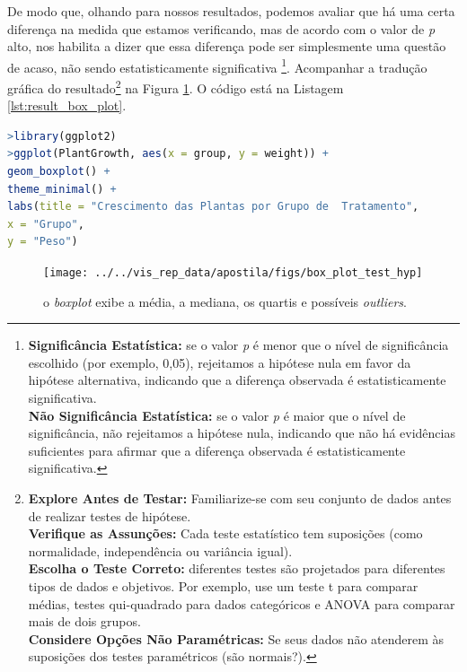 \documentclass[article]{memoir}
\begin{document}
De modo que, olhando para nossos resultados, podemos avaliar que há uma certa diferença na medida que estamos verificando, mas de acordo com o valor de \textit{p} alto, nos habilita a dizer que essa diferença pode ser simplesmente uma questão de acaso, não sendo estatisticamente significativa \footnote{\textbf{Significância Estatística:} se o valor \textit{p} é menor que o nível de significância escolhido (por exemplo, 0,05), rejeitamos a hipótese nula em favor da hipótese alternativa, indicando que a diferença observada é estatisticamente significativa.\\
	
	\textbf{Não Significância Estatística:} se o valor \textit{p} é maior que o nível de significância, não rejeitamos a hipótese nula, indicando que não há evidências suficientes para afirmar que a diferença observada é estatisticamente significativa.}. Acompanhar a tradução gráfica do resultado\footnote{\textbf{Explore Antes de Testar:} Familiarize-se com seu conjunto de dados antes de realizar testes de hipótese. \\
	\textbf{Verifique as Assunções:} Cada teste estatístico tem suposições (como normalidade, independência ou variância igual). \\ 
	\textbf{Escolha o Teste Correto:} diferentes testes são projetados para diferentes tipos de dados e objetivos. Por exemplo, use um teste t para comparar médias, testes qui-quadrado para dados categóricos e ANOVA para comparar mais de dois grupos.\\
	\textbf{Considere Opções Não Paramétricas:} Se seus dados não atenderem às suposições dos testes paramétricos (são normais?).} na Figura \ref{fig:boxplottesthyp}. O código está na Listagem \ref{lst:result_box_plot}.

\begin{lstlisting}[language={R}, caption={apresenta os resultados em forma gráfica.}, label={lst:result_box_plot}]
>library(ggplot2)
>ggplot(PlantGrowth, aes(x = group, y = weight)) +
geom_boxplot() +
theme_minimal() +
labs(title = "Crescimento das Plantas por Grupo de  Tratamento",
x = "Grupo",
y = "Peso")
\end{lstlisting}


\begin{figure}[ht]
	\centering
	\texttt{[image: ../../vis\_rep\_data/apostila/figs/box\_plot\_test\_hyp]}
	\caption{o \textit{boxplot} exibe a média, a mediana, os quartis e possíveis \textit{outliers}.}
	\label{fig:boxplottesthyp}
\end{figure}
\end{document}
